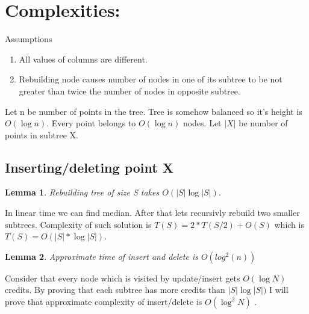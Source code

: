 \documentclass[10pt,a4paper]{article}
\newtheorem{lemma}{Lemma}
\begin{document}
\section{Complexities:}

Assumptions
\begin{enumerate}
\item All values of columns are different.
\item Rebuilding node causes number of nodes in one of its subtree to be not greater than twice the number of nodes in opposite subtree.
\end{enumerate}

Let n be number of points in the tree. Tree is somehow balanced so it's height is $O(\log n)$. Every point belongs to $O(\log n)$ nodes. Let $|X|$ be number of points in subtree X.

\subsection{Inserting/deleting point X}
\begin{lemma}\label{lem:1}
Rebuilding tree of size S takes $O(|S| \log |S|)$.
\end{lemma}

In linear time we can find median. After that lets recursivly rebuild two smaller subtrees. Complexity of such solution is $T(S) = 2 * T(S/2) + O(S)$ which is $T(S) = O(|S| * \log |S|).$

\begin{lemma}\label{lem:2}
Approximate time of insert and delete is $O(log^2 (n))$
\end{lemma}

Consider that every node which is visited by update/insert gets $O(\log N)$ credits. By proving that each subtree has more credits than $|S| \log |S|)$ I will prove that approximate complexity of insert/delete is $O(\log^2{N})$ .
\end{document}
